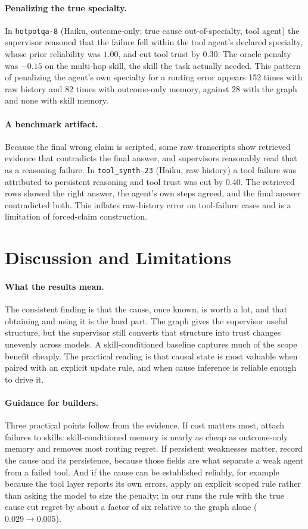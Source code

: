 \documentclass[letterpaper]{article}
\begin{document}
\paragraph{Penalizing the true specialty.}
In \texttt{hotpotqa-8} (Haiku, outcome-only; true cause out-of-specialty, tool agent) the supervisor reasoned that the failure fell within the tool agent's declared specialty, whose prior reliability was $1.00$, and cut tool trust by $0.30$. The oracle penalty was $-0.15$ on the multi-hop skill, the skill the task actually needed. This pattern of penalizing the agent's own specialty for a routing error appears 152 times with raw history and 82 times with outcome-only memory, against 28 with the graph and none with skill memory.

\paragraph{A benchmark artifact.}
Because the final wrong claim is scripted, some raw transcripts show retrieved evidence that contradicts the final answer, and supervisors reasonably read that as a reasoning failure. In \texttt{tool\_synth-23} (Haiku, raw history) a tool failure was attributed to persistent reasoning and tool trust was cut by $0.40$. The retrieved rows showed the right answer, the agent's own steps agreed, and the final answer contradicted both. This inflates raw-history error on tool-failure cases and is a limitation of forced-claim construction.

\section{Discussion and Limitations}
\paragraph{What the results mean.}
The consistent finding is that the cause, once known, is worth a lot, and that obtaining and using it is the hard part. The graph gives the supervisor useful structure, but the supervisor still converts that structure into trust changes unevenly across models. A skill-conditioned baseline captures much of the scope benefit cheaply. The practical reading is that causal state is most valuable when paired with an explicit update rule, and when cause inference is reliable enough to drive it.

\paragraph{Guidance for builders.}
Three practical points follow from the evidence. If cost matters most, attach failures to skills: skill-conditioned memory is nearly as cheap as outcome-only memory and removes most routing regret. If persistent weaknesses matter, record the cause and its persistence, because those fields are what separate a weak agent from a failed tool. And if the cause can be established reliably, for example because the tool layer reports its own errors, apply an explicit scoped rule rather than asking the model to size the penalty; in our runs the rule with the true cause cut regret by about a factor of six relative to the graph alone ($0.029\to0.005$).
\end{document}
